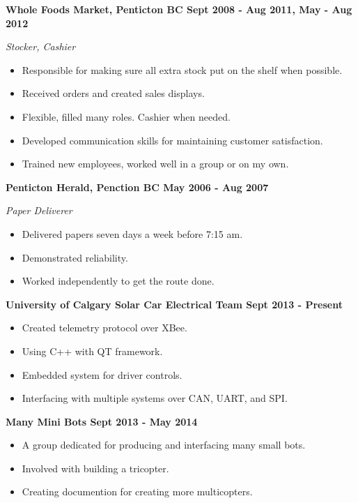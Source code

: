 \documentclass[12pt]{article} %
\begin{document}
\noindent \centerline{ \bf Whole Foods Market, Penticton BC \hfill Sept 2008 - Aug 2011, May - Aug 2012}
\indent \emph{Stocker, Cashier}
\begin{itemize}[noitemsep]
  \item Responsible for making sure all extra stock put on the shelf when possible.
  \item Received orders and created sales displays.
  \item Flexible, filled many roles. Cashier when needed.
  \item Developed communication skills for maintaining customer satisfaction.
  \item Trained new employees, worked well in a group or on my own.
\end{itemize}

\noindent \centerline{ \bf Penticton Herald, Penction BC \hfill May 2006 - Aug 2007}
\indent \emph{ Paper Deliverer}
\begin{itemize}[noitemsep]
  \item Delivered papers seven days a week before 7:15 am.
  \item Demonstrated reliability.
  \item Worked independently to get the route done.
\end{itemize}

\bigskip
{}
\bigskip

\noindent \centerline{\bf University of Calgary Solar Car Electrical Team \hfill Sept 2013 - Present}
\begin{itemize}[noitemsep]
  \item Created telemetry protocol over XBee.
  \item Using C++ with QT framework. 
  \item Embedded system for driver controls.
  \item Interfacing with multiple systems over CAN, UART, and SPI.
\end{itemize}

\noindent \centerline{\bf Many Mini Bots \hfill Sept 2013 - May 2014}
\begin{itemize}[noitemsep]
  \item A group dedicated for producing and interfacing many small bots.
  \item Involved with building a tricopter.
  \item Creating documention for creating more multicopters.
\end{itemize}
\end{document}
